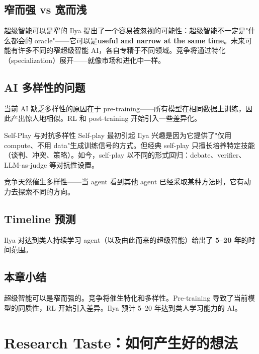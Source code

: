 \documentclass[a4paper]{article}
\begin{document}
\subsection{窄而强 vs 宽而浅}

\begin{importantbox}{超级智能可以是窄的}
Ilya 提出了一个容易被忽视的可能性：超级智能不一定是"什么都会的 oracle"——它可以是\textbf{useful and narrow at the same time}。未来可能有许多不同的窄超级智能 AI，各自专精于不同领域。竞争将通过特化（specialization）展开——就像市场和进化中一样。
\end{importantbox}

\subsection{AI 多样性的问题}

当前 AI 缺乏多样性的原因在于 pre-training——所有模型在相同数据上训练，因此产出惊人地相似。RL 和 post-training 开始引入一些差异化。

\begin{knowledgebox}{Self-Play 与对抗多样性}
Self-play 最初引起 Ilya 兴趣是因为它提供了"仅用 compute、不用 data"生成训练信号的方式。但经典 self-play 只擅长培养特定技能（谈判、冲突、策略）。如今，self-play 以不同的形式回归：debate、verifier、LLM-as-judge 等对抗性设置。

竞争天然催生多样性——当 agent 看到其他 agent 已经采取某种方法时，它有动力去探索不同的方向。
\end{knowledgebox}

\subsection{Timeline 预测}

Ilya 对达到类人持续学习 agent（以及由此而来的超级智能）给出了 \textbf{5--20 年}的时间范围。

\subsection{本章小结}

超级智能可以是窄而强的。竞争将催生特化和多样性。Pre-training 导致了当前模型的同质性，RL 开始引入差异。Ilya 预计 5--20 年达到类人学习能力的 AI。


\section{Research Taste：如何产生好的想法}
\end{document}
